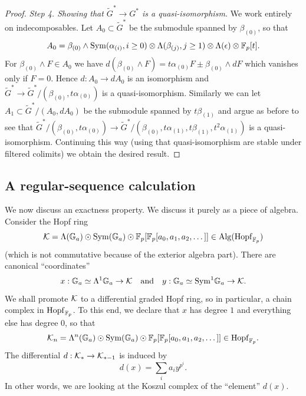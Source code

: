 \begin{proof}
\emph{Step 4. Showing that $\tilde G^* \to G^*$ is a quasi-isomorphism.}
We work entirely on indecomposables.
Let $A_0 \subset \tilde G^*$ be the submodule spanned by $\beta_{(0)}$, so that \[ A_0 = \beta_{(0)} \wedge \mathrm{Sym}(\alpha_{(i)}, i \ge 0) \otimes \Lambda(\beta_{(j)}, j \ge 1) \otimes \Lambda(\epsilon) \otimes \mathbb{F}_p[t]. \]
For $\beta_{(0)} \wedge F \in A_0$ we have $d(\beta_{(0)} \wedge F) = t\alpha_{(0)} F \pm \beta_{(0)} \wedge dF$ which vanishes only if $F=0$.
Hence $d: A_0 \to dA_0$ is an isomorphism and $\tilde G^* \to \tilde G^*/(\beta_{(0)}, t\alpha_{(0)})$ is a quasi-isomorphism.
Similarly we can let $A_1 \subset \tilde G^*/(A_0, dA_0)$ be the submodule spanned by $t\beta_{(1)}$ and argue as before to see that $\tilde G^*/(\beta_{(0)}, t\alpha_{(0)}) \to \tilde G^*/(\beta_{(0)}, t\alpha_{(1)}, t\beta_{(1)}, t^2\alpha_{(1)})$ is a quasi-isomorphism.
Continuing this way (using that quasi-isomorphism are stable under filtered colimits) we obtain the desired result.
\end{proof}

\subsection{A regular-sequence calculation}\label{app:rw-koszul}

We now discuss an exactness property.
We discuss it purely as a piece of algebra.
Consider the Hopf ring \[ \mathcal K = \Lambda({\mathbb G}_a) \odot \mathrm{Sym}({\mathbb G}_a) \odot \mathbb{F}_p[\mathbb{F}_p[a_0, a_1, a_2, \dots]] \in \mathrm{Alg}(\mathrm{Hopf}_{\mathbb{F}_p}) \] (which is not commutative because of the exterior algebra part).
There are canonical ``coordinates'' \[ x: {\mathbb G}_a \simeq \Lambda^1 {\mathbb G}_a \to \mathcal K \quad\text{and}\quad y: {\mathbb G}_a \simeq \mathrm{Sym}^1 {\mathbb G}_a \to \mathcal K. \]
We shall promote $\mathcal K$ to a differential graded Hopf ring, so in particular, a chain complex in $\mathrm{Hopf}_{\mathbb{F}_p}$.
To this end, we declare that $x$ has degree $1$ and everything else has degree $0$, so that \[ \mathcal K_n = \Lambda^n({\mathbb G}_a) \odot \mathrm{Sym}({\mathbb G}_a) \odot \mathbb{F}_p[\mathbb{F}_p[a_0, a_1, a_2, \dots]] \in \mathrm{Hopf}_{\mathbb{F}_p}. \]
The differential $d: \mathcal K_* \to \mathcal K_{*-1}$ is induced by \[ d(x) = \sum_i a_i y^{p^i}. \]
In other words, we are looking at the Koszul complex of the ``element'' $d(x)$.

